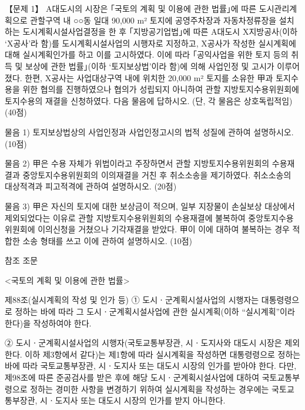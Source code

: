 \begin{longquestion}{【문제 1】}
A대도시의 시장은 ｢국토의 계획 및 이용에 관한 법률｣에 따른 도시관리계획으로 관할구역 내 ○○동 일대 90,000 m² 토지에 공영주차장과 자동차정류장을 설치하는 도시계획시설사업결정을 한 후 ｢지방공기업법｣에 따른 A대도시 X지방공사(이하 ‘X공사’라 함)를 도시계획시설사업의 시행자로 지정하고, X공사가 작성한 실시계획에 대해 실시계획인가를 하고 이를 고시하였다. 이에 따라 ｢공익사업을 위한 토지 등의 취득 및 보상에 관한 법률｣(이하 ‘토지보상법’이라 함)에 의해 사업인정 및 고시가 이루어졌다. 한편, X공사는 사업대상구역 내에 위치한 20,000 m² 토지를 소유한 甲과 토지수용을 위한 협의를 진행하였으나 협의가 성립되지 아니하여 관할 지방토지수용위원회에 토지수용의 재결을 신청하였다. 다음 물음에 답하시오. (단, 각 물음은 상호독립적임) (40점) \par
\medskip\noindent 물음 1) 토지보상법상의 사업인정과 사업인정고시의 법적 성질에 관하여 설명하시오. (10점) \par
\medskip\noindent 물음 2) 甲은 수용 자체가 위법이라고 주장하면서 관할 지방토지수용위원회의 수용재결과 중앙토지수용위원회의 이의재결을 거친 후 취소소송을 제기하였다. 취소소송의 대상적격과 피고적격에 관하여 설명하시오. (20점) \par
\medskip\noindent 물음 3) 甲은 자신의 토지에 대한 보상금이 적으며, 일부 지장물이 손실보상 대상에서 제외되었다는 이유로 관할 지방토지수용위원회의 수용재결에 불복하여 중앙토지수용위원회에 이의신청을 거쳤으나 기각재결을 받았다. 甲이 이에 대하여 불복하는 경우 적합한 소송 형태를 쓰고 이에 관하여 설명하시오. (10점) \par
\begin{framedtext}
참조 조문 \par
<국토의 계획 및 이용에 관한 법률> \par
제88조(실시계획의 작성 및 인가 등) ① 도시ㆍ군계획시설사업의 시행자는 대통령령으로 정하는 바에 따라 그 도시ㆍ군계획시설사업에 관한 실시계획(이하 “실시계획”이라 한다)을 작성하여야 한다. \par
② 도시ㆍ군계획시설사업의 시행자(국토교통부장관, 시ㆍ도지사와 대도시 시장은 제외한다. 이하 제3항에서 같다)는 제1항에 따라 실시계획을 작성하면 대통령령으로 정하는 바에 따라 국토교통부장관, 시ㆍ도지사 또는 대도시 시장의 인가를 받아야 한다. 다만, 제98조에 따른 준공검사를 받은 후에 해당 도시ㆍ군계획시설사업에 대하여 국토교통부령으로 정하는 경미한 사항을 변경하기 위하여 실시계획을 작성하는 경우에는 국토교통부장관, 시ㆍ도지사 또는 대도시 시장의 인가를 받지 아니한다. \par

\end{framedtext}
\end{longquestion}
